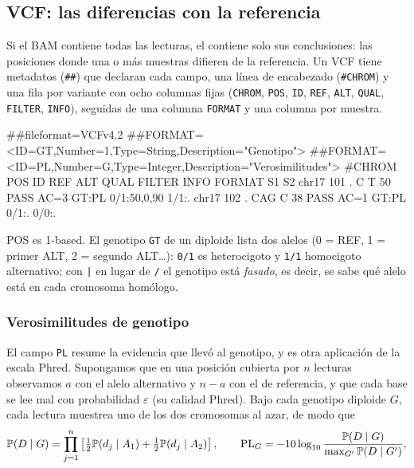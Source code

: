 \subsection{VCF: las diferencias con la referencia}

Si el BAM contiene todas las lecturas, el  \parencite{c02-danecek2011} contiene solo sus conclusiones: las posiciones donde una o más muestras difieren de la referencia. Un VCF tiene metadatos (\texttt{\#\#}) que declaran cada campo, una línea de encabezado (\texttt{\#CHROM}) y una fila por variante con ocho columnas fijas (\texttt{CHROM}, \texttt{POS}, \texttt{ID}, \texttt{REF}, \texttt{ALT}, \texttt{QUAL}, \texttt{FILTER}, \texttt{INFO}), seguidas de una columna \texttt{FORMAT} y una columna por muestra.

\begin{consola}
##fileformat=VCFv4.2
##FORMAT=<ID=GT,Number=1,Type=String,Description="Genotipo">
##FORMAT=<ID=PL,Number=G,Type=Integer,Description="Verosimilitudes">
#CHROM POS ID REF ALT QUAL FILTER INFO   FORMAT S1        S2
chr17  101 .  C   T   50   PASS   AC=3   GT:PL  0/1:50,0,90 1/1:.
chr17  102 .  CAG C   38   PASS   AC=1   GT:PL  0/1:.       0/0:.
\end{consola}

POS es 1-based. El genotipo \texttt{GT} de un diploide lista dos alelos (0 = REF, 1 = primer ALT, 2 = segundo ALT\ldots): \texttt{0/1} es heterocigoto y \texttt{1/1} homocigoto alternativo; con \texttt{|} en lugar de \texttt{/} el genotipo está \emph{fasado}, es decir, se sabe qué alelo está en cada cromosoma homólogo.

\subsubsection{Verosimilitudes de genotipo}

El campo \texttt{PL} resume la evidencia que llevó al genotipo, y es otra aplicación de la escala Phred. Supongamos que en una posición cubierta por $n$ lecturas observamos $a$ con el alelo alternativo y $n-a$ con el de referencia, y que cada base se lee mal con probabilidad $\varepsilon$ (su calidad Phred). Bajo cada genotipo diploide $G$, cada lectura muestrea uno de los dos cromosomas al azar, de modo que
\begin{equation}\label{eq:02-glik}
\mathbb{P}(D \mid G) = \prod_{j=1}^{n} \left[\tfrac{1}{2}\mathbb{P}(d_j\mid A_1) + \tfrac{1}{2}\mathbb{P}(d_j\mid A_2)\right],
\qquad
\mathrm{PL}_G = -10\log_{10}\frac{\mathbb{P}(D\mid G)}{\max_{G'}\mathbb{P}(D\mid G')},
\end{equation}
\begin{simbolos}
\end{simbolos}

